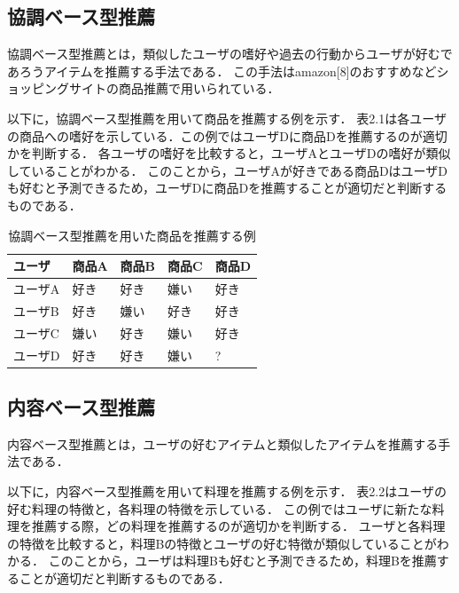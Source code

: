 \documentclass{funthesis}
\begin{document}
\subsection{協調ベース型推薦}
協調ベース型推薦とは，類似したユーザの嗜好や過去の行動からユーザが好むであろうアイテムを推薦する手法である．
この手法はamazon[8]のおすすめなどショッピングサイトの商品推薦で用いられている．

以下に，協調ベース型推薦を用いて商品を推薦する例を示す．
表2.1は各ユーザの商品への嗜好を示している．この例ではユーザDに商品Dを推薦するのが適切かを判断する．
各ユーザの嗜好を比較すると，ユーザAとユーザDの嗜好が類似していることがわかる．
このことから，ユーザAが好きである商品DはユーザDも好むと予測できるため，ユーザDに商品Dを推薦することが適切だと判断するものである．

\begin{table}[htb]
  \begin{center}
  \scriptsize
    \caption{協調ベース型推薦を用いた商品を推薦する例}
    \normalsize
   \begin{tabular}{p{2.5cm}||p{2.5cm}|p{2.5cm}|p{2.5cm}|p{2.5cm}}
    \hline
ユーザ & 商品A & 商品B & 商品C & 商品D \\ \hline\hline
      ユーザA & 好き & 好き & 嫌い & 好き \\ \hline
      ユーザB & 好き & 嫌い & 好き & 好き \\ \hline
      ユーザC & 嫌い & 好き & 嫌い & 好き \\ \hline
      ユーザD & 好き & 好き & 嫌い & ? \\ \hline
  \end{tabular}
  \end{center}
\end{table}

\subsection{内容ベース型推薦}
内容ベース型推薦とは，ユーザの好むアイテムと類似したアイテムを推薦する手法である．

以下に，内容ベース型推薦を用いて料理を推薦する例を示す．
表2.2はユーザの好む料理の特徴と，各料理の特徴を示している．
この例ではユーザに新たな料理を推薦する際，どの料理を推薦するのが適切かを判断する．
ユーザと各料理の特徴を比較すると，料理Bの特徴とユーザの好む特徴が類似していることがわかる．
このことから，ユーザは料理Bも好むと予測できるため，料理Bを推薦することが適切だと判断するものである．
\end{document}
